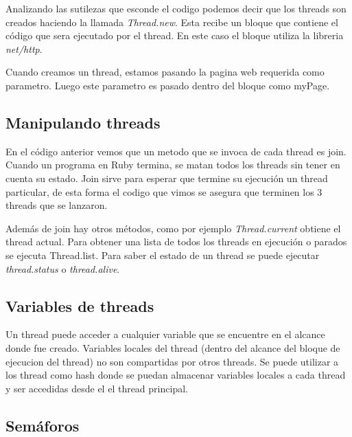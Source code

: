 \documentclass{article}
\begin{document}
	Analizando las sutilezas que esconde el codigo podemos decir que los threads son creados haciendo la llamada \textit{Thread.new}. Esta recibe un bloque que contiene el código que sera ejecutado por el thread. En este caso el bloque utiliza la libreria \textit{net/http}.
	\par
	Cuando creamos un thread, estamos pasando la pagina web requerida como parametro. Luego este parametro es pasado dentro del bloque como myPage.
\bigskip



\subsection{Manipulando threads}

	En el código anterior vemos que un metodo que se invoca de cada thread es join. Cuando un programa en Ruby termina, se matan todos los threads sin tener en cuenta su estado. Join sirve para esperar que termine su ejecución un thread particular, de esta forma el codigo que vimos se asegura que terminen los 3 threads que se lanzaron.
	\par
	Además de join hay otros métodos, como por ejemplo \textit{Thread.current} obtiene el thread actual. Para obtener una lista de todos los threads en ejecución o parados se ejecuta Thread.list. Para saber el estado de un thread se puede ejecutar \textit{thread.status} o \textit{thread.alive}.
\bigskip



\subsection{Variables de threads}
Un thread puede acceder a cualquier variable que se encuentre en el alcance donde fue creado. Variables locales del thread (dentro del alcance del bloque de ejecucion del thread) no son compartidas por otros threads. Se puede utilizar a los thread como hash donde se puedan almacenar variables locales a cada thread y ser accedidas desde el el thread principal.

 
\bigskip



\subsection{Semáforos}
\end{document}
